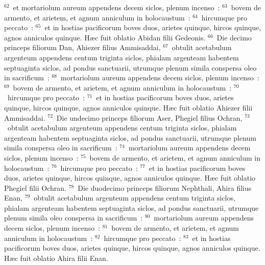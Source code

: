 ${}^{62}$~et mortariolum aureum appendens decem siclos, plenum incenso~:
${}^{63}$~bovem de armento, et arietem, et agnum anniculum in holocaustum~:
${}^{64}$~hircumque pro peccato~:
${}^{65}$~et in hostias pacificorum boves duos, arietes quinque, hircos quinque, agnos anniculos quinque. H\ae c fuit oblatio Abidan filii Gedeonis.
${}^{66}$~Die decimo princeps filiorum Dan, Ahiezer filius Ammisaddai,
${}^{67}$~obtulit acetabulum argenteum appendens centum triginta siclos, phialam argenteam habentem septuaginta siclos, ad pondus sanctuarii, utrumque plenum simila conspersa oleo in sacrificum~:
${}^{68}$~mortariolum aureum appendens decem siclos, plenum incenso~:
${}^{69}$~bovem de armento, et arietem, et agnum anniculum in holocaustum~:
${}^{70}$~hircumque pro peccato~:
${}^{71}$~et in hostias pacificorum boves duos, arietes quinque, hircos quinque, agnos anniculos quinque. H\ae c fuit oblatio Ahiezer filii Ammisaddai.
${}^{72}$~Die undecimo princeps filiorum Aser, Phegiel filius Ochran,
${}^{73}$~obtulit acetabulum argenteum appendens centum triginta siclos, phialam argenteam habentem septuaginta siclos, ad pondus sanctuarii, utrumque plenum simila conspersa oleo in sacrificum~:
${}^{74}$~mortariolum aureum appendens decem siclos, plenum incenso~:
${}^{75}$~bovem de armento, et arietem, et agnum anniculum in holocaustum~:
${}^{76}$~hircumque pro peccato~:
${}^{77}$~et in hostias pacificorum boves duos, arietes quinque, hircos quinque, agnos anniculos quinque. H\ae c fuit oblatio Phegiel filii Ochran.
${}^{78}$~Die duodecimo princeps filiorum Nephthali, Ahira filius Enan,
${}^{79}$~obtulit acetabulum argenteum appendens centum triginta siclos, phialam argenteam habentem septuaginta siclos, ad pondus sanctuarii, utrumque plenum simila oleo conspersa in sacrificum~:
${}^{80}$~mortariolum aureum appendens decem siclos, plenum incenso~:
${}^{81}$~bovem de armento, et arietem, et agnum anniculum in holocaustum~:
${}^{82}$~hircumque pro peccato~:
${}^{83}$~et in hostias pacificorum boves duos, arietes quinque, hircos quinque, agnos anniculos quinque. H\ae c fuit oblatio Ahira filii Enan.


